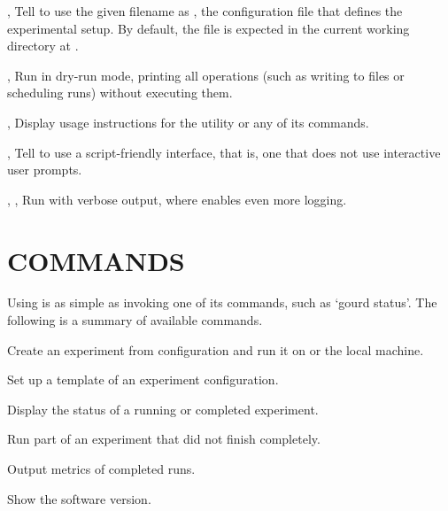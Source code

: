 \documentclass[a4paper,english]{article}
\begin{document}
        \begin{Description}[Options]
            \item[\oOptArg{-c}{ filename}, \OptArg{--config}{ filename}]
            Tell  to use the given filename as , the configuration
            file that defines the experimental setup.
            By default, the file is expected in the current working directory at .
            \item[\Opt{-d}, \Opt{--dry-run}]
            Run  in dry-run mode, printing all operations (such as writing to files or scheduling runs)
            without executing them.
            \item[\Opt{-h}, \Opt{--help}]
            Display usage instructions for the  utility or any of its commands.
            \item[\Opt{-s}, \Opt{--script}]
            Tell  to use a script-friendly interface, that is, one that does not use
            interactive user prompts.
            \item[\Opt{-v}, \Opt{-vv}, \Opt{--verbose}]
            Run  with verbose output, where  enables even more logging.
        \end{Description}

    \section{COMMANDS}

        Using  is as simple as invoking one of its commands, such as `gourd status'.
        The following is a summary of available commands.

        \begin{Description}[Commands]
            \item[\Prog{gourd} \Arg{run}]
            Create an experiment from configuration and run it on  or the local machine.
            \item[\Prog{gourd} \Arg{init}]
            Set up a template of an experiment configuration.
            \item[\Prog{gourd} \Arg{status}]
            Display the status of a running or completed experiment.
            \item[\Prog{gourd} \Arg{continue}]
            Run part of an experiment that did not finish completely.
            \item[\Prog{gourd} \Arg{analyse}]
            Output metrics of completed runs.
            \item[\Prog{gourd} \Arg{version}]
            Show the software version.
        \end{Description}
\end{document}

